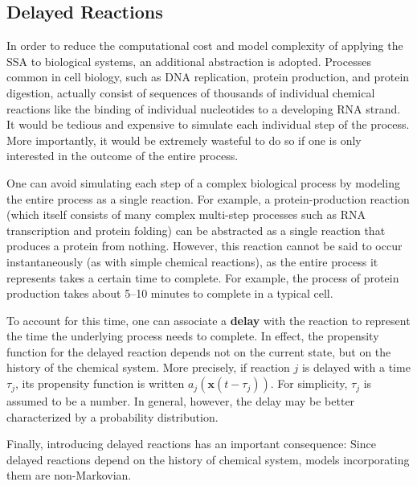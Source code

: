 \documentclass[english,letterpaper,12pt]{article}
\newcommand{\defkeywd}[1]{\textbf{#1}}
\renewcommand{\vec}[1]{\ensuremath{\mathbf{#1}}}
\newcommand{\delaytime}{\ensuremath{\tau}}
\begin{document}
\begin{doublespacing}
\subsection{Delayed Reactions} %
\label{sub:delayed-reactions}

In order to reduce the computational cost and model complexity of applying the SSA to biological systems, an additional abstraction is adopted. Processes common in cell biology, such as DNA replication, protein production, and protein digestion, actually consist of sequences of thousands  of individual chemical reactions like the binding of individual nucleotides to a developing RNA strand. It would be tedious and expensive to simulate each individual step of the process. More importantly, it would be extremely wasteful to do so if one is only interested in the outcome of the entire process. 

One can avoid simulating each step of a complex biological process by modeling the entire process as a single reaction. For example, a protein-production reaction (which itself consists of many complex multi-step processes such as RNA transcription and protein folding) can be abstracted as a single reaction that produces a protein from nothing. However, this reaction cannot be said to occur instantaneously (as with simple chemical reactions), as the entire process it represents takes a certain time to complete. For example, the process of protein production  takes about 5--10 minutes to complete in a typical cell. 

To account for this time, one can associate a \defkeywd{delay} with the reaction to represent the time the underlying process needs to complete. In effect, the propensity function for the delayed reaction depends not on the current state, but on the history of the chemical system. More precisely, if reaction $j$ is delayed with a time $\delaytime_j$, its propensity function is written $a_j \left(\vec{x}(t - \delaytime_j) \right)$. For simplicity, $\delaytime_j$ is assumed to be a number. In general, however, the delay may be better characterized by a probability distribution.

Finally, introducing delayed reactions has an important consequence: Since delayed reactions depend on the history of chemical system, models incorporating them are non-Markovian. 


\end{doublespacing}
\end{document}
